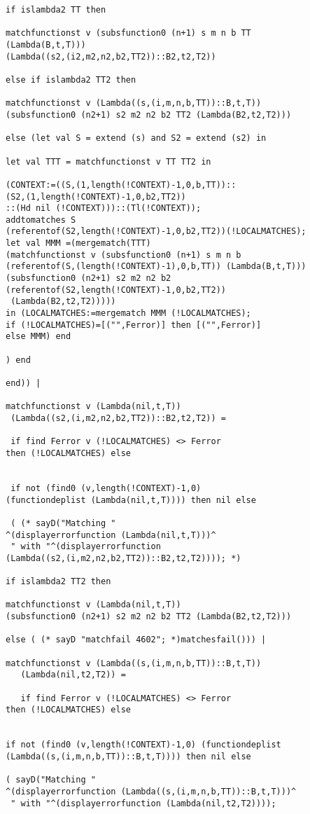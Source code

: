 \documentclass[12pt]{article}
\begin{document}
\begin{verbatim}
if islambda2 TT then

matchfunctionst v (subsfunction0 (n+1) s m n b TT 
(Lambda(B,t,T)))
(Lambda((s2,(i2,m2,n2,b2,TT2))::B2,t2,T2))

else if islambda2 TT2 then

matchfunctionst v (Lambda((s,(i,m,n,b,TT))::B,t,T)) 
(subsfunction0 (n2+1) s2 m2 n2 b2 TT2 (Lambda(B2,t2,T2)))

else (let val S = extend (s) and S2 = extend (s2) in

let val TTT = matchfunctionst v TT TT2 in

(CONTEXT:=((S,(1,length(!CONTEXT)-1,0,b,TT))::
(S2,(1,length(!CONTEXT)-1,0,b2,TT2))
::(Hd nil (!CONTEXT)))::(Tl(!CONTEXT));
addtomatches S 
(referentof(S2,length(!CONTEXT)-1,0,b2,TT2))(!LOCALMATCHES);
let val MMM =(mergematch(TTT)
(matchfunctionst v (subsfunction0 (n+1) s m n b 
(referentof(S,(length(!CONTEXT)-1),0,b,TT)) (Lambda(B,t,T)))
(subsfunction0 (n2+1) s2 m2 n2 b2 
(referentof(S2,length(!CONTEXT)-1,0,b2,TT2))
 (Lambda(B2,t2,T2)))))
in (LOCALMATCHES:=mergematch MMM (!LOCALMATCHES);
if (!LOCALMATCHES)=[("",Ferror)] then [("",Ferror)]
else MMM) end 

) end

end)) |

matchfunctionst v (Lambda(nil,t,T)) 
 (Lambda((s2,(i,m2,n2,b2,TT2))::B2,t2,T2)) =
 
 if find Ferror v (!LOCALMATCHES) <> Ferror 
then (!LOCALMATCHES) else

 
 if not (find0 (v,length(!CONTEXT)-1,0) 
(functiondeplist (Lambda(nil,t,T)))) then nil else
 
 ( (* sayD("Matching "
^(displayerrorfunction (Lambda(nil,t,T)))^
 " with "^(displayerrorfunction 
(Lambda((s2,(i,m2,n2,b2,TT2))::B2,t2,T2)))); *)

if islambda2 TT2 then

matchfunctionst v (Lambda(nil,t,T))
(subsfunction0 (n2+1) s2 m2 n2 b2 TT2 (Lambda(B2,t2,T2))) 

else ( (* sayD "matchfail 4602"; *)matchesfail())) |

matchfunctionst v (Lambda((s,(i,m,n,b,TT))::B,t,T))
   (Lambda(nil,t2,T2)) = 
   
   if find Ferror v (!LOCALMATCHES) <> Ferror 
then (!LOCALMATCHES) else

   
if not (find0 (v,length(!CONTEXT)-1,0) (functiondeplist 
(Lambda((s,(i,m,n,b,TT))::B,t,T)))) then nil else
   
( sayD("Matching "
^(displayerrorfunction (Lambda((s,(i,m,n,b,TT))::B,t,T)))^
 " with "^(displayerrorfunction (Lambda(nil,t2,T2)))); 


\end{verbatim}
\end{document}

